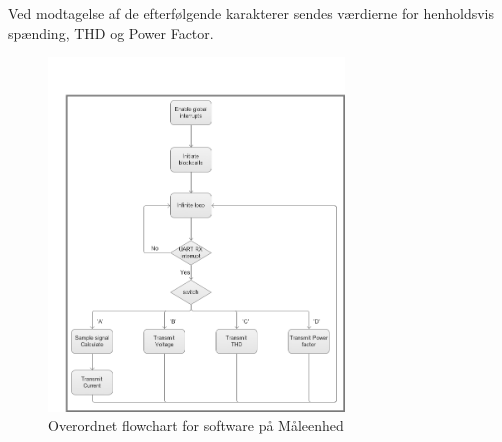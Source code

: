 Ved modtagelse af de efterfølgende karakterer sendes værdierne for henholdsvis spænding, THD og Power Factor. 
\begin{figure}[htbp] %
	\centering
	\includegraphics[width=0.7\textwidth]{Figure/MEflowchart.png}
	\caption{Overordnet flowchart for software på Måleenhed}
	\label{fig:MEflowchart}
\end{figure}


